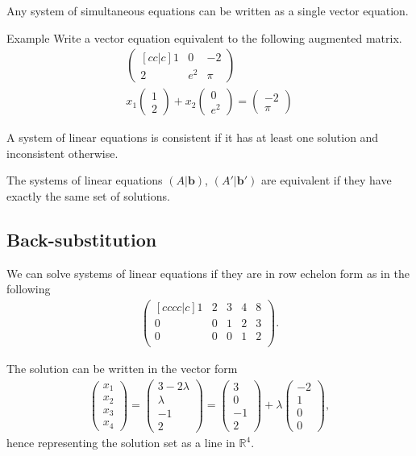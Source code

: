 \documentclass{report}
\renewcommand{\vec}{\mathbf}
\newcommand{\cvec}[1]{ \begin{pmatrix} #1 \end{pmatrix} }
\begin{document}
		Any system of simultaneous equations can be written as a single vector equation.

		\begin{question}{Example}
			Write a vector equation equivalent to the following augmented matrix.
				\begin{align*}
					\begin{pmatrix}[cc|c]
						1 & 0 & -2	\\
						2 & e^2 & \pi
					\end{pmatrix}	\\
					x_1 \cvec{1\\2} + x_2 \cvec{0\\e^2} = \cvec{-2\\\pi}
				\end{align*}
		\end{question}

		A system of linear equations is consistent if it has at least one solution and inconsistent otherwise.

		The systems of linear equations $(A|\vec{b})$, $(A'|\vec{b'})$ are equivalent if they have exactly the same set of solutions.

		\subsection{Back-substitution}
			
			We can solve systems of linear equations if they are in row echelon form as in the following
				\begin{align*}
					\begin{pmatrix}[cccc|c]
						1 & 2 & 3 & 4 & 8	\\
						0 & 0 & 1 & 2 & 3	\\
						0 & 0 & 0 & 1 & 2	\\
					\end{pmatrix}.
				\end{align*}

			The solution can be written in the vector form
			\begin{align*}
				\cvec{x_1\\x_2\\x_3\\x_4} = \cvec{3-2\lambda\\\lambda\\-1\\2} = \cvec{3\\0\\-1\\2} + \lambda\cvec{-2\\1\\0\\0},
			\end{align*}
			hence representing the solution set as a line in $\mathbb{R}^4$.
\end{document}
